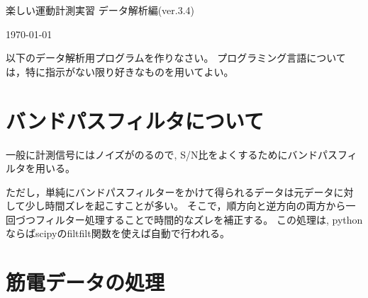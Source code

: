 \documentclass{jsarticle}
\def\version{3.4}
\begin{document}
\begin{center}
  {\LARGE 楽しい運動計測実習 データ解析編(ver.\version)}
\end{center}
\begin{flushright}
\today
\end{flushright}

以下のデータ解析用プログラムを作りなさい。
プログラミング言語については，特に指示がない限り好きなものを用いてよい。


\section{バンドパスフィルタについて}  
一般に計測信号にはノイズがのるので, S/N比をよくするためにバンドパスフィルタを用いる。

ただし，単純にバンドパスフィルターをかけて得られるデータは元データに対して少し時間ズレを起こすことが多い。
そこで，順方向と逆方向の両方から一回づつフィルター処理することで時間的なズレを補正する。
この処理は, pythonならばscipyのfiltfilt関数を使えば自動で行われる。

\section{筋電データの処理}
\end{document}
